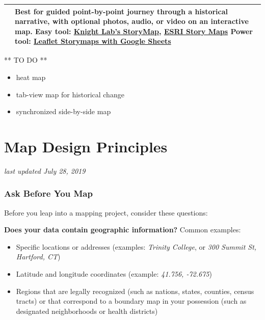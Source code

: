 \documentclass[
  english,
]{book}
\providecommand{\tightlist}{%
  \setlength{\itemsep}{0pt}\setlength{\parskip}{0pt}}
\begin{document}
\begin{longtable}[]{@{}ll@{}}
\begin{minipage}[t]{0.47\columnwidth}
\end{minipage} & \begin{minipage}[t]{0.47\columnwidth}\raggedright
Best for guided point-by-point journey through a historical narrative, with optional photos, audio, or video on an interactive map. Easy tool: \href{https://storymap.knightlab.com/}{Knight Lab's StoryMap}, \href{https://storymaps.arcgis.com/en/}{ESRI Story Maps} Power tool: \href{leaflet-storymaps-with-google-sheets}{Leaflet Storymaps with Google Sheets}\strut
\end{minipage}\tabularnewline
\bottomrule
\end{longtable}

** TO DO **

\begin{itemize}
\tightlist
\item
  heat map
\item
  tab-view map for historical change
\item
  synchronized side-by-side map
\end{itemize}

\hypertarget{map-design}{%
\section{Map Design Principles}\label{map-design}}

\emph{last updated July 28, 2019}

\hypertarget{ask-before-you-map}{%
\subsubsection*{Ask Before You Map}\label{ask-before-you-map}}

Before you leap into a mapping project, consider these questions:

\textbf{Does your data contain geographic information?} Common examples:

\begin{itemize}
\tightlist
\item
  Specific locations or addresses (examples: \emph{Trinity College}, or \emph{300 Summit St, Hartford, CT})
\item
  Latitude and longitude coordinates (example: \emph{41.756, -72.675})
\item
  Regions that are legally recognized (such as nations, states, counties, census tracts) or that correspond to a boundary map in your possession (such as designated neighborhoods or health districts)
\end{itemize}
\end{document}
